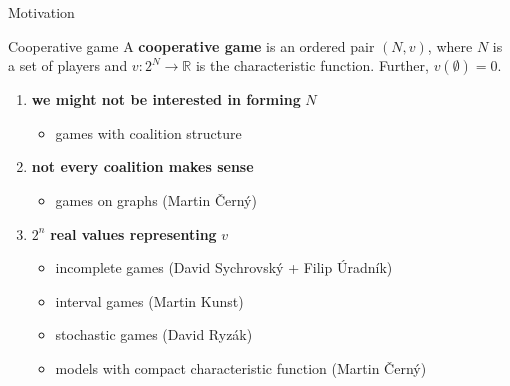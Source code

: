 \documentclass{beamer}
\begin{document}
\begin{frame}{Motivation}
    \begin{block}{Cooperative game}
        A \textbf{cooperative game} is an ordered pair $(N,v)$, where $N$ is a set of players and $v\colon 2^N \to \mathbb{R}$ is the characteristic function. Further, $v(\emptyset) = 0$.
    \end{block}
	\begin{enumerate}
		\item \textbf{we might not be interested in forming} $N$
		\begin{itemize}
			\item games with coalition structure
		\end{itemize}
		\item \textbf{not every coalition makes sense}
		\begin{itemize}
			\item games on graphs (Martin Černý)
		\end{itemize}
		\item $2^n$ \textbf{real values representing} $v$
		\begin{itemize}
			\item incomplete games (David Sychrovský + Filip Úradník)
			\item interval games (Martin Kunst)
			\item stochastic games (David Ryzák)
			\item models with compact characteristic function (Martin Černý)
		\end{itemize}
	\end{enumerate}
\end{frame}

\end{document}
